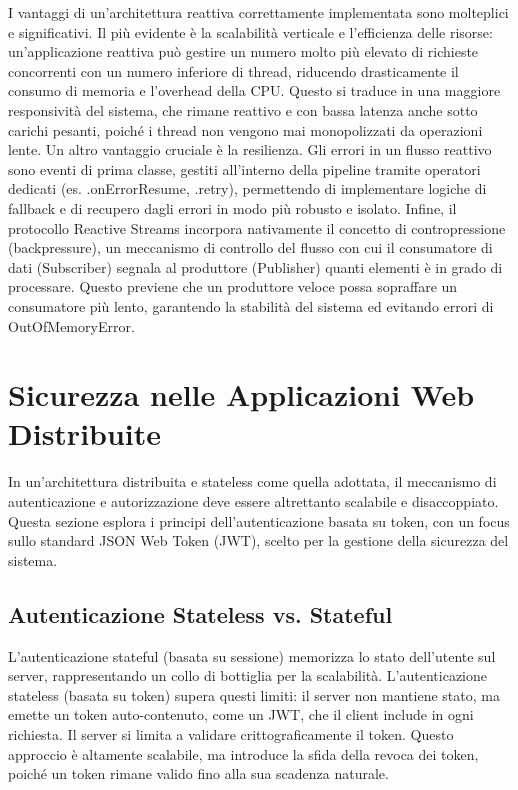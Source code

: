 \documentclass[12pt,a4paper,openright,twoside]{book}
\begin{document}
I vantaggi di un'architettura reattiva correttamente implementata sono molteplici e significativi. Il più evidente è la scalabilità verticale e l'efficienza delle risorse: un'applicazione reattiva può gestire un numero molto più elevato di richieste concorrenti con un numero inferiore di thread, riducendo drasticamente il consumo di memoria e l'overhead della CPU. Questo si traduce in una maggiore responsività del sistema, che rimane reattivo e con bassa latenza anche sotto carichi pesanti, poiché i thread non vengono mai monopolizzati da operazioni lente. Un altro vantaggio cruciale è la resilienza. Gli errori in un flusso reattivo sono eventi di prima classe, gestiti all'interno della pipeline tramite operatori dedicati (es. .onErrorResume, .retry), permettendo di implementare logiche di fallback e di recupero dagli errori in modo più robusto e isolato. Infine, il protocollo Reactive Streams incorpora nativamente il concetto di contropressione (backpressure), un meccanismo di controllo del flusso con cui il consumatore di dati (Subscriber) segnala al produttore (Publisher) quanti elementi è in grado di processare. Questo previene che un produttore veloce possa sopraffare un consumatore più lento, garantendo la stabilità del sistema ed evitando errori di OutOfMemoryError.


\section{Sicurezza nelle Applicazioni Web Distribuite}

In un'architettura distribuita e stateless come quella adottata, il meccanismo di autenticazione e autorizzazione deve essere altrettanto scalabile e disaccoppiato. Questa sezione esplora i principi dell'autenticazione basata su token, con un focus sullo standard JSON Web Token (JWT), scelto per la gestione della sicurezza del sistema.

\subsection{Autenticazione Stateless vs. Stateful}
L'autenticazione stateful (basata su sessione) memorizza lo stato dell'utente sul server, rappresentando un collo di bottiglia per la scalabilità. L'autenticazione stateless (basata su token) supera questi limiti: il server non mantiene stato, ma emette un token auto-contenuto, come un JWT, che il client include in ogni richiesta. Il server si limita a validare crittograficamente il token. Questo approccio è altamente scalabile, ma introduce la sfida della revoca dei token, poiché un token rimane valido fino alla sua scadenza naturale.
\end{document}
